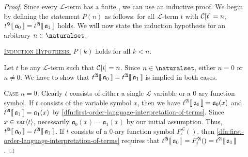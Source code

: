 \begin{proof}
    Since every \( \mathcal{L} \)-term has a finite , we can use an inductive proof.
    We begin by defining the statement \( P(n) \) as follows: for all \( \mathcal{L} \)-term \( t \) with \( \folcomplexityofterm{t} = n \),
    \( t^{\mathfrak{A}}\llbracket\, \mathfrak{a}_{0} \,\rrbracket = t^{\mathfrak{A}}\llbracket\, \mathfrak{a}_{1} \,\rrbracket \) holds.
    We will now state the induction hypothesis for an arbitrary \( n \in \naturalset \).

    \vspace{0.3cm}
    \noindent
    \underline{\scshape Induction Hypothesis:}
    \( P(k) \) holds for all \( k < n \).

    \vspace{0.3cm}
    \noindent
    Let \( t \) be any \( \mathcal{L} \)-term such that \( \folcomplexityofterm{t} = n \).
    Since \( n \in \naturalset \), either \( n = 0 \) or \( n \neq 0 \).
    We have to show that \( t^{\mathfrak{A}}\llbracket\, \mathfrak{a}_{0} \,\rrbracket = t^{\mathfrak{A}}\llbracket\, \mathfrak{a}_{1} \,\rrbracket \) is implied in both cases.

    \vspace{0.3cm}
    \noindent
    {\scshape Case} \( n = 0 \):
    Clearly \( t \) consists of either a single \( \mathcal{L} \)-variable or a 0-ary function symbol.
    If \( t \) consists of the variable symbol \( x \), then we have \( t^{\mathfrak{A}}\llbracket\, \mathfrak{a}_{0} \,\rrbracket = \mathfrak{a}_{0}(x) \)
    and \( t^{\mathfrak{A}}\llbracket\, \mathfrak{a}_{1} \,\rrbracket = \mathfrak{a}_{1}(x) \) by \cref{dfn:first-order-language-interpretation-of-terms}.
    Since \( x \in \operatorname{var} \langle t\rangle \), necessarily \( \mathfrak{a}_{0}(x) = \mathfrak{a}_{1}(x) \) by our initial assumption.
    Thus, \( t^{\mathfrak{A}}\llbracket\, \mathfrak{a}_{0} \,\rrbracket = t^{\mathfrak{A}}\llbracket\, \mathfrak{a}_{1} \,\rrbracket \).
    If \( t \) consists of a 0-ary function symbol \( F^{\mathcal{L}}_{i}() \), then \cref{dfn:first-order-language-interpretation-of-terms}
    requires that \( t^{\mathfrak{A}}\llbracket\, \mathfrak{a}_{0} \,\rrbracket = F^{\mathfrak{A}}_{i}() = t^{\mathfrak{A}}\llbracket\, \mathfrak{a}_{1} \,\rrbracket \).


\end{proof}
